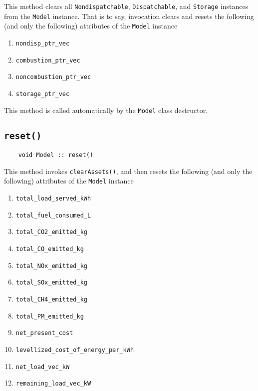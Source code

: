 \documentclass[12pt, letterpaper]{report}
\begin{document}
This method clears all \texttt{Nondispatchable}, \texttt{Dispatchable}, and \texttt{Storage} instances from the \texttt{Model} instance. That is to say, invocation clears and resets the following (and only the following) attributes of the \texttt{Model} instance

\begin{enumerate}
    \item \texttt{nondisp\_ptr\_vec}
    \item \texttt{combustion\_ptr\_vec}
    \item \texttt{noncombustion\_ptr\_vec}
    \item \texttt{storage\_ptr\_vec}
\end{enumerate}

\noindent This method is called automatically by the \texttt{Model} class destructor.

\subsection{\texttt{reset(\;\;)}}

\begin{verbatim}
    void Model :: reset()
\end{verbatim}

This method invokes \texttt{clearAssets(\;\;)}, and then resets the following (and only the following) attributes of the \texttt{Model} instance

\begin{enumerate}
    \item \texttt{total\_load\_served\_kWh}
    \item \texttt{total\_fuel\_consumed\_L}
    \item \texttt{total\_CO2\_emitted\_kg}
    \item \texttt{total\_CO\_emitted\_kg}
    \item \texttt{total\_NOx\_emitted\_kg}
    \item \texttt{total\_SOx\_emitted\_kg}
    \item \texttt{total\_CH4\_emitted\_kg}
    \item \texttt{total\_PM\_emitted\_kg}
    \item \texttt{net\_present\_cost}
    \item \texttt{levellized\_cost\_of\_energy\_per\_kWh}
    \item \texttt{net\_load\_vec\_kW}
    \item \texttt{remaining\_load\_vec\_kW}
\end{enumerate}
\end{document}
